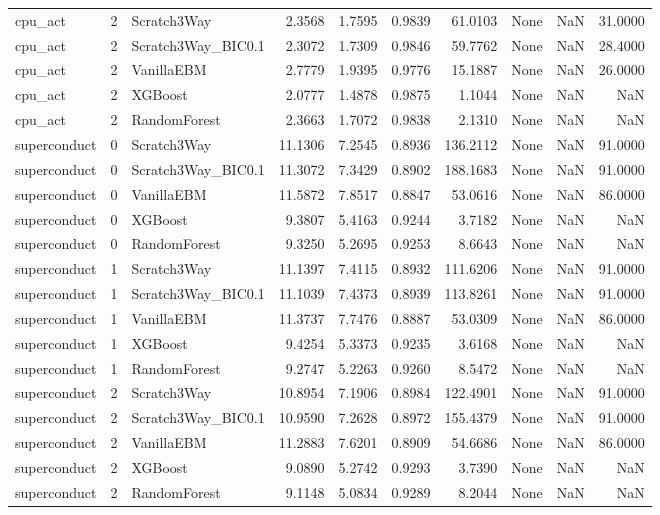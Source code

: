 \begin{tabular}{lrlrrrrlrr}
cpu_act & 2 & Scratch3Way & 2.3568 & 1.7595 & 0.9839 & 61.0103 & None & NaN & 31.0000 \\
cpu_act & 2 & Scratch3Way_BIC0.1 & 2.3072 & 1.7309 & 0.9846 & 59.7762 & None & NaN & 28.4000 \\
cpu_act & 2 & VanillaEBM & 2.7779 & 1.9395 & 0.9776 & 15.1887 & None & NaN & 26.0000 \\
cpu_act & 2 & XGBoost & 2.0777 & 1.4878 & 0.9875 & 1.1044 & None & NaN & NaN \\
cpu_act & 2 & RandomForest & 2.3663 & 1.7072 & 0.9838 & 2.1310 & None & NaN & NaN \\
superconduct & 0 & Scratch3Way & 11.1306 & 7.2545 & 0.8936 & 136.2112 & None & NaN & 91.0000 \\
superconduct & 0 & Scratch3Way_BIC0.1 & 11.3072 & 7.3429 & 0.8902 & 188.1683 & None & NaN & 91.0000 \\
superconduct & 0 & VanillaEBM & 11.5872 & 7.8517 & 0.8847 & 53.0616 & None & NaN & 86.0000 \\
superconduct & 0 & XGBoost & 9.3807 & 5.4163 & 0.9244 & 3.7182 & None & NaN & NaN \\
superconduct & 0 & RandomForest & 9.3250 & 5.2695 & 0.9253 & 8.6643 & None & NaN & NaN \\
superconduct & 1 & Scratch3Way & 11.1397 & 7.4115 & 0.8932 & 111.6206 & None & NaN & 91.0000 \\
superconduct & 1 & Scratch3Way_BIC0.1 & 11.1039 & 7.4373 & 0.8939 & 113.8261 & None & NaN & 91.0000 \\
superconduct & 1 & VanillaEBM & 11.3737 & 7.7476 & 0.8887 & 53.0309 & None & NaN & 86.0000 \\
superconduct & 1 & XGBoost & 9.4254 & 5.3373 & 0.9235 & 3.6168 & None & NaN & NaN \\
superconduct & 1 & RandomForest & 9.2747 & 5.2263 & 0.9260 & 8.5472 & None & NaN & NaN \\
superconduct & 2 & Scratch3Way & 10.8954 & 7.1906 & 0.8984 & 122.4901 & None & NaN & 91.0000 \\
superconduct & 2 & Scratch3Way_BIC0.1 & 10.9590 & 7.2628 & 0.8972 & 155.4379 & None & NaN & 91.0000 \\
superconduct & 2 & VanillaEBM & 11.2883 & 7.6201 & 0.8909 & 54.6686 & None & NaN & 86.0000 \\
superconduct & 2 & XGBoost & 9.0890 & 5.2742 & 0.9293 & 3.7390 & None & NaN & NaN \\
superconduct & 2 & RandomForest & 9.1148 & 5.0834 & 0.9289 & 8.2044 & None & NaN & NaN \\

\end{tabular}
